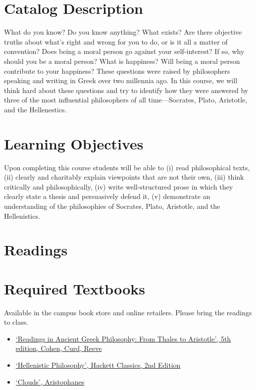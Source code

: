 \documentclass[article,oneside]{memoir}
\begin{document}
\section{Catalog Description}

What do you know? Do you know anything? What exists? Are there objective truths about what’s right and wrong for you to do, or is it all a matter of convention? Does being a moral person go against your self-interest? If so, why should you be a moral person? What is happiness? Will being a moral person contribute to your happiness? These questions were raised by philosophers speaking and writing in Greek over two millennia ago. In this course, we will think hard about these questions and try to identify how they were answered by three of the most influential philosophers of all time---Socrates, Plato, Aristotle, and the Hellenestics. 

\section{Learning Objectives}

Upon completing this course students will be able to (i) read
philosophical texts, (ii) clearly and charitably explain viewpoints that
are not their own, (iii) think critically and philosophically, (iv)
write well-structured prose in which they clearly state a thesis and
persuasively defend it, (v) demonstrate an understanding of the
philosophies of Socrates, Plato, Aristotle, and the Hellenistics.


\section{Readings}
\section{Required Textbooks}

Available in the campus book store and online retailers. Please bring the readings to class.
\begin{itemize}
\item \href{https://www.amazon.com/Readings-Ancient-Greek-Philosophy-Aristotle/dp/1624665322/ref=dp_ob_title_bk}{`Readings in Ancient Greek Philosophy: From Thales to Aristotle', 5th edition, Cohen, Curd, Reeve}
\item \href{http://www.amazon.com/Hellenistic-Philosophy-Hackett-Classics-Inwood/dp/0872203786/ref=sr_1_1?ie=UTF8&qid=1452099186&sr=8-1&keywords=hellenistic+philosophy}{`Hellenistic Philosophy', Hackett Classics, 2nd Edition}
\item \href{https://www.amazon.com/Clouds-Aristophanes/dp/0872205169/ref=sr_1_2?s=books&ie=UTF8&qid=1515009741&sr=1-2&keywords=aristophanes+clouds}{`Clouds', Aristophanes}

\end{itemize}
\end{document}
